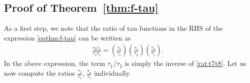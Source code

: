 \documentclass[a4paper,reqno,11pt]{amsart}
\numberwithin{equation}{section}
\numberwithin{figure}{section}
\theoremstyle{plain}
\theoremstyle{remark}
\numberwithin{rhp}{section}
\begin{document}
\subsection{Proof of Theorem~\ref{thm:f-tau}}\label{subsec:prooftheoremf}

As a first step, we note that the ratio of tau functions in the RHS of the expression \eqref{eqthm:f-tau} can be written as
\begin{align}
    \frac{\tau_3 \tau_4}{\tau_2 \tau_1} = \left(\frac{\tau_3}{\tau_1} \right)\left(\frac{\tau_1}{\tau_2} \right) \left(\frac{\tau_4}{\tau_1} \right).
\end{align}
In the above expression, the term $\tau_1/\tau_2$ is simply the inverse of \eqref{rat:t7t8}. Let us now compute the ratios $\frac{\tau_3}{\tau_1}$, $\frac{\tau_4}{\tau_1}$ individually.
\end{document}
